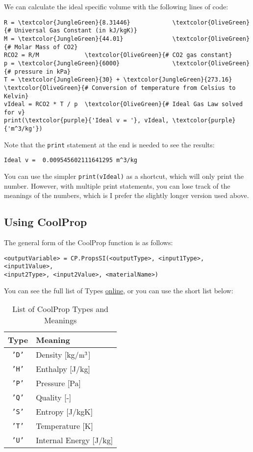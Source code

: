 We can calculate the ideal specific volume with the following lines of code:
\begin{Verbatim}[commandchars=\\\{\}]
R = \textcolor{JungleGreen}{8.31446}            \textcolor{OliveGreen}{# Universal Gas Constant (in kJ/kgK)}
M = \textcolor{JungleGreen}{44.01}              \textcolor{OliveGreen}{# Molar Mass of CO2}
RCO2 = R/M             \textcolor{OliveGreen}{# CO2 gas constant}
p = \textcolor{JungleGreen}{6000}               \textcolor{OliveGreen}{# pressure in kPa}
T = \textcolor{JungleGreen}{30} + \textcolor{JungleGreen}{273.16}        \textcolor{OliveGreen}{# Conversion of temperature from Celsius to Kelvin}
vIdeal = RCO2 * T / p  \textcolor{OliveGreen}{# Ideal Gas Law solved for v}
print(\textcolor{purple}{'Ideal v = '}, vIdeal, \textcolor{purple}{'m^3/kg'})   
\end{Verbatim}
Note that the \texttt{print} statement at the end is needed to see the results:
\begin{Verbatim}
Ideal v =  0.009545602111641295 m^3/kg
\end{Verbatim}
You can use the simpler \texttt{print(vIdeal)} as a shortcut, which will only print the number.  However, with multiple print statements, you can lose track of the meanings of the numbers, which is I prefer the slightly longer version used above.

\subsection{Using CoolProp}
The general form of the CoolProp function is as follows:
\begin{Verbatim}[commandchars=\\\{\}]
<outputVariable> = CP.PropsSI(<outputType>, <input1Type>, <input1Value>,
<input2Type>, <input2Value>, <materialName>)
\end{Verbatim}
You can see the full list of Types \href{http://www.coolprop.org/coolprop/HighLevelAPI.html#table-of-string-inputs-to-propssi-function}{online}, or you can use the short list below:
\begin{table}[H]
  \centering
  \caption{List of CoolProp Types and Meanings}
  \label{tab:ch2_CoolProp}
  \begin{tabular}{cl}
  Type & Meaning \\ \hline
  \texttt{'D'} & Density [kg/$\rm m^3$]\\
  \texttt{'H'} & Enthalpy [J/kg]\\
  \texttt{'P'} & Pressure [Pa]\\
  \texttt{'Q'} & Quality  [-]\\
  \texttt{'S'} & Entropy  [J/kgK]\\
  \texttt{'T'} & Temperature [K]\\
  \texttt{'U'} & Internal Energy [J/kg]
  \end{tabular}
\end{table}

